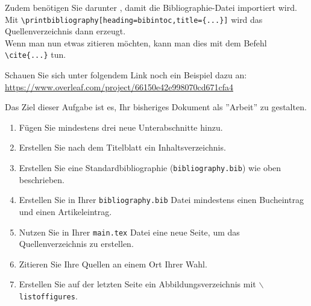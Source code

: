 \bigskip
\noindent Zudem benötigen Sie darunter \verb||, damit die Bibliographie-Datei importiert wird.
Mit \verb|\printbibliography[heading=bibintoc,title={...}]| wird das Quellenverzeichnis dann erzeugt.\\
Wenn man nun etwas zitieren möchten, kann man dies mit dem Befehl \verb|\cite{...}| tun. 

\bigskip
\noindent Schauen Sie sich unter folgendem Link noch ein Beispiel dazu an:\\
\url{https://www.overleaf.com/project/66150e42e998070cd671cfa4}

\newpage
\begin{ex}
Das Ziel dieser Aufgabe ist es, Ihr bisheriges Dokument als ''Arbeit'' zu gestalten.
\begin{enumerate}
	\item Fügen Sie mindestens drei neue Unterabschnitte hinzu.
	\item Erstellen Sie nach dem Titelblatt ein Inhaltsverzeichnis.
	\item Erstellen Sie eine Standardbibliographie (\texttt{bibliography.bib}) wie oben beschrieben.
	\item Erstellen Sie in Ihrer \texttt{bibliography.bib} Datei mindestens einen Bucheintrag und einen Artikeleintrag.
	\item Nutzen Sie in Ihrer \texttt{main.tex} Datei eine neue Seite, um das Quellenverzeichnis zu erstellen.
	\item Zitieren Sie Ihre Quellen an einem Ort Ihrer Wahl.
	\item Erstellen Sie auf der letzten Seite ein Abbildungsverzeichnis mit $\backslash$\texttt{listoffigures}.
	\end{enumerate}
\end{ex}
